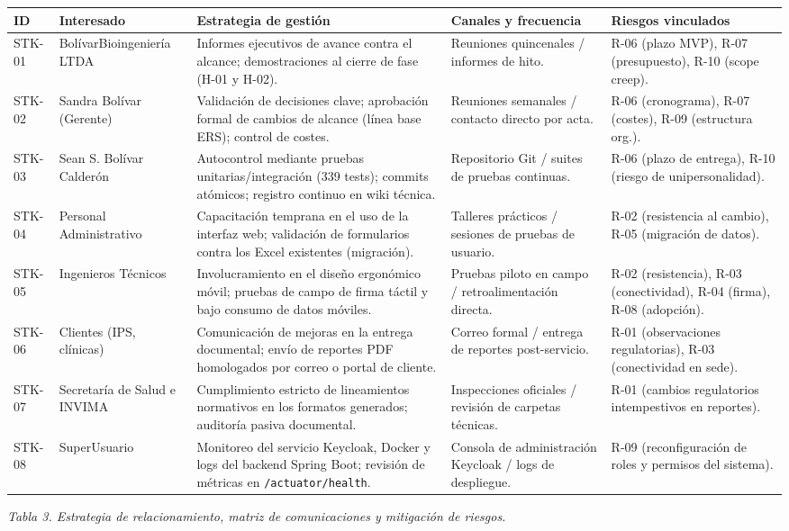 \documentclass[12pt,varwidth=170mm,border=10pt]{standalone}
\newcommand{\ruta}[1]{\nolinkurl{#1}}
\newcommand{\tablecaption}[2]{%
  \par\vspace{0.4em}%
  \begin{center}
    \footnotesize\textit{Tabla #1. #2}
  \end{center}
  \vspace{1.0em}%
}
\begin{document}
\begingroup
\small
\begin{center}
\begin{tabular}{|C{1.2cm}|L{2.8cm}|L{3.7cm}|L{3.3cm}|L{3.2cm}|}
\hline
\textbf{ID} & \textbf{Interesado} & \textbf{Estrategia de gestión} & \textbf{Canales y frecuencia} & \textbf{Riesgos vinculados} \\
\hline
STK-01 & Bolívar\-Bioingeniería LTDA & Informes ejecutivos de avance contra el alcance; demostraciones al cierre de fase (H-01 y H-02). & Reuniones quincenales / informes de hito. & R-06 (plazo MVP), R-07 (presupuesto), R-10 (scope creep). \\
\hline
STK-02 & Sandra Bolívar (Gerente) & Validación de decisiones clave; aprobación formal de cambios de alcance (línea base ERS); control de costes. & Reuniones semanales / contacto directo por acta. & R-06 (cronograma), R-07 (costes), R-09 (estructura org.). \\
\hline
STK-03 & Sean S. Bolívar Calderón & Autocontrol mediante pruebas unitarias/integración (339 tests); commits atómicos; registro continuo en wiki técnica. & Repositorio Git / suites de pruebas continuas. & R-06 (plazo de entrega), R-10 (riesgo de unipersonalidad). \\
\hline
STK-04 & Personal Administrativo & Capacitación temprana en el uso de la interfaz web; validación de formularios contra los Excel existentes (migración). & Talleres prácticos / sesiones de pruebas de usuario. & R-02 (resistencia al cambio), R-05 (migración de datos). \\
\hline
STK-05 & Ingenieros Técnicos & Involucramiento en el diseño ergonómico móvil; pruebas de campo de firma táctil y bajo consumo de datos móviles. & Pruebas piloto en campo / retroalimentación directa. & R-02 (resistencia), R-03 (conectividad), R-04 (firma), R-08 (adopción). \\
\hline
STK-06 & Clientes (IPS, clínicas) & Comunicación de mejoras en la entrega documental; envío de reportes PDF homologados por correo o portal de cliente. & Correo formal / entrega de reportes post-servicio. & R-01 (observaciones regulatorias), R-03 (conectividad en sede). \\
\hline
STK-07 & Secretaría de Salud e INVIMA & Cumplimiento estricto de lineamientos normativos en los formatos generados; auditoría pasiva documental. & Inspecciones oficiales / revisión de carpetas técnicas. & R-01 (cambios regulatorios intempestivos en reportes). \\
\hline
STK-08 & SuperUsuario & Monitoreo del servicio Keycloak, Docker y logs del backend Spring Boot; revisión de métricas en \ruta{/actuator/health}. & Consola de administración Keycloak / logs de despliegue. & R-09 (reconfiguración de roles y permisos del sistema). \\
\hline
\end{tabular}
\end{center}
\tablecaption{3}{Estrategia de relacionamiento, matriz de comunicaciones y mitigación de riesgos.}
\endgroup
\end{document}
